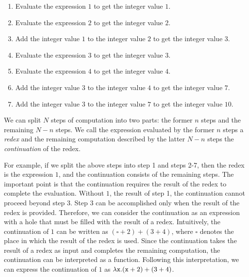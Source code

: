 \begin{enumerate}
  \item Evaluate the expression $1$ to get the integer value $1$.
  \item Evaluate the expression $2$ to get the integer value $2$.
  \item Add the integer value $1$ to the integer value $2$ to get the integer
    value $3$.
  \item Evaluate the expression $3$ to get the integer value $3$.
  \item Evaluate the expression $4$ to get the integer value $4$.
  \item Add the integer value $3$ to the integer value $4$ to get the integer
    value $7$.
  \item Add the integer value $3$ to the integer value $7$ to get the integer
    value $10$.
\end{enumerate}

We can split $N$ steps of computation into two parts: the former $n$ steps and the
remaining $N-n$ steps. We call the expression evaluated by the former $n$ steps
a \textit{redex} and the remaining computation described by the
latter $N-n$ steps the \textit{continuation} of the redex.

For example, if we split the above steps into step 1 and steps 2-7, then the redex is
the expression $1$, and the continuation consists of the remaining steps.
The important point is that the continuation requires the result of the redex to
complete the evaluation. Without $1$, the result of step 1, the continuation
cannot proceed beyond step 3. Step 3 can be accomplished only when the result of
the redex is provided. Therefore, we can consider the continuation as an
expression with a hole that must be filled with the result of a redex.
Intuitively, the continuation of $1$ can be written as $(\square+2)+(3+4)$, where
$\square$ denotes the place in which the result of the redex is used.
Since the continuation takes the result of a redex as input and completes the
remaining computation, the continuation can be interpreted as a function.
Following this interpretation, we can express the continuation of $1$ as
$\lambda\texttt{x}.(\texttt{x}+2)+(3+4)$.

